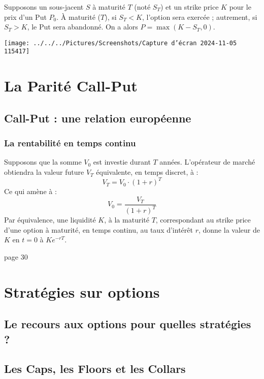 \documentclass[a4paper, 12pt]{report}
\begin{document}
Supposons un sous-jacent \( S \) à maturité \( T \) (noté \( S_T \)) et un strike price \( K \) pour le prix d’un Put \( P_0 \). À maturité (\( T \)), si \( S_T < K \), l’option sera exercée ; autrement, si \( S_T > K \), le Put sera abandonné. On a alors \( P = \max(K - S_T, 0) \).

\begin{center}
	\texttt{[image: ../../../Pictures/Screenshots/Capture d'écran 2024-11-05 115417]}
\end{center}


\section{La Parité Call-Put}

\subsection{Call-Put : une relation européenne}

\subsubsection{La rentabilité en temps continu}

Supposons que la somme \( V_0 \) est investie durant \( T \) années. L’opérateur de marché obtiendra la valeur future \( V_T \) équivalente, en temps discret, à :
\[
V_T = V_0 \cdot (1 + r)^T 
\]
Ce qui amène à :
\[
V_0 = \frac{V_T}{(1 + r)^T} 
\]
Par équivalence, une liquidité \( K \), à la maturité \( T \), correspondant au strike price d’une option à maturité, en temps continu, au taux d’intérêt \( r \), donne la valeur de \( K \) en \( t = 0 \) à \( K e^{-rT} \).

page 30

\section{Stratégies sur options}

\subsection{Le recours aux options pour quelles stratégies ?}

\subsection{Les Caps, les Floors et les Collars}
\end{document}
